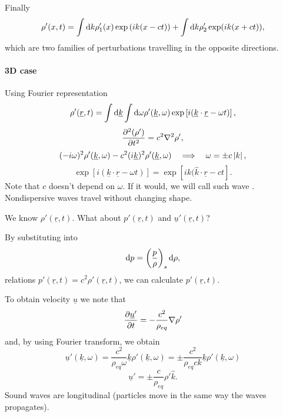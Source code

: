 \documentclass[11pt,oneside]{book}
\renewcommand{\vec}[1]{\underline{#1}}
\theoremstyle{definition} %
\theoremstyle{plain} %
\theoremstyle{remark} %
\theoremstyle{underline}
\begin{document}
  Finally
  \begin{displaymath}
    \rho'(x, t) = \int \mathrm{d} k \rho_1'(x) \exp\left( i k (x - c t) \right) + \int \mathrm{d} k \rho_2' \exp(ik ( x + ct)),
  \end{displaymath}
  which are two families of perturbations travelling in the opposite directions.

  \paragraph{3D case}

  Using Fourier representation
  \begin{displaymath}
    \rho'(\vec r, t) = \int \d \vec k \int \d \omega \rho'(\vec k, \omega) \exp\left[ i( \vec k \cdot \vec r - \omega t )\right],
  \end{displaymath}
  \begin{displaymath}
    \frac{\partial^2 (\rho')}{\partial t ^ 2} = c^2 \nabla^2 \rho',
  \end{displaymath}
  \begin{displaymath}
    (- i\omega)^2 \rho'(\vec k, \omega) - c^2 (i\vec k)^2 \rho'(\vec k, \omega) \qLRa \omega = \pm c \abs{k},
  \end{displaymath}
  \begin{displaymath}
    \exp\left[ i(\vec k \cdot \vec r - \omega t) \right] = \exp\left[ i k ( \hat{k} \cdot \vec r - c t \right].
  \end{displaymath}
  Note that $c$ doesn't depend on $\omega$. 
  If it would, we will call such wave .
  Nondispersive waves travel without changing shape.

  We know $\rho'(\vec r, t)$. What about $p'(\vec r, t)$ and $\vec u'(\vec r, t)$?

  By substituting into
  \begin{displaymath}
    \mathrm{d} p = \left( \frac{p}{\rho} \right)_s \mathrm{d} \rho, 
  \end{displaymath}
  relations $p'(\vec r, t) = c^2 \rho'(\vec r, t)$, we can calculate $p'(\vec r, t)$.

  To obtain velocity $\vec u$ we note that
  \begin{displaymath}
    \ptf{\vec u'}{t}  = - \frac{c^2}{\rho_{eq}} \nabla \rho'
  \end{displaymath}
  and, by using Fourier transform, we obtain
  \begin{displaymath}
    \vec u' (\vec k, \omega) = \frac{c^2}{\rho_{eq}\omega}\vec k \rho'(\vec k, \omega) 
    = \pm\frac{c^2}{\rho_{eq} ck } \vec k \rho'(\vec k, \omega) 
  \end{displaymath}
  \begin{displaymath}
    \vec u' = \pm  \frac{c}{\rho_{eq}} \rho' \hat k.
  \end{displaymath}
  Sound waves are longitudinal (particles move in the same way the waves propagates).
\end{document}

